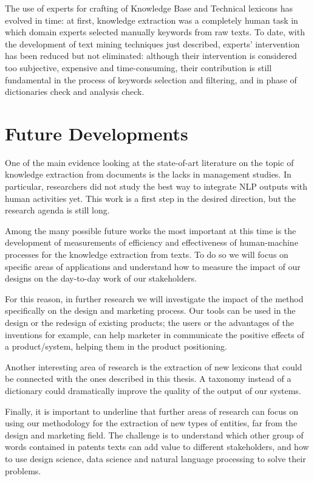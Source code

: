 \documentclass[]{book}
\theoremstyle{definition}
\theoremstyle{definition}
\theoremstyle{definition}
\theoremstyle{remark}
\begin{document}
The use of experts for crafting of Knowledge Base and Technical lexicons
has evolved in time: at first, knowledge extraction was a completely
human task in which domain experts selected manually keywords from raw
texts. To date, with the development of text mining techniques just
described, experts' intervention has been reduced but not eliminated:
although their intervention is considered too subjective, expensive and
time-consuming, their contribution is still fundamental in the process
of keywords selection and filtering, and in phase of dictionaries check
and analysis check.

\chapter{Future Developments}\label{future-developments}

One of the main evidence looking at the state-of-art literature on the
topic of knowledge extraction from documents is the lacks in management
studies. In particular, researchers did not study the best way to
integrate NLP outputs with human activities yet. This work is a first
step in the desired direction, but the research agenda is still long.

Among the many possible future works the most important at this time is
the development of measurements of efficiency and effectiveness of
human-machine processes for the knowledge extraction from texts. To do
so we will focus on specific areas of applications and understand how to
measure the impact of our designs on the day-to-day work of our
stakeholders.

For this reason, in further research we will investigate the impact of
the method specifically on the design and marketing process. Our tools
can be used in the design or the redesign of existing products; the
users or the advantages of the inventions for example, can help marketer
in communicate the positive effects of a product/system, helping them in
the product positioning.

Another interesting area of research is the extraction of new lexicons
that could be connected with the ones described in this thesis. A
taxonomy instead of a dictionary could dramatically improve the quality
of the output of our systems.

Finally, it is important to underline that further areas of research can
focus on using our methodology for the extraction of new types of
entities, far from the design and marketing field. The challenge is to
understand which other group of words contained in patents texts can add
value to different stakeholders, and how to use design science, data
science and natural language processing to solve their problems.
\end{document}

